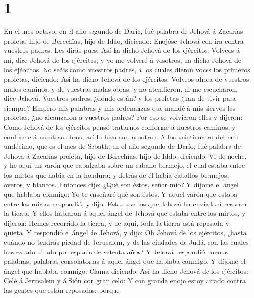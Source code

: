 \hypertarget{section}{%
\section{1}\label{section}}

 En el mes octavo, en el año segundo de Darío, fué palabra
de Jehová á Zacarías profeta, hijo de Berechîas, hijo de Iddo, diciendo:
 Enojóse Jehová con ira contra vuestros padres. 
Les dirás pues: Así ha dicho Jehová de los ejércitos: Volveos á mí, dice
Jehová de los ejércitos, y yo me volveré á vosotros, ha dicho Jehová de
los ejércitos.  No seáis como vuestros padres, á los cuales
dieron voces los primeros profetas, diciendo: Así ha dicho Jehová de los
ejércitos: Volveos ahora de vuestros malos caminos, y de vuestras malas
obras: y no atendieron, ni me escucharon, dice Jehová. 
Vuestros padres, ¿dónde están? y los profetas ¿han de vivir para
siempre?  Empero mis palabras y mis ordenanzas que mandé á
mis siervos los profetas, ¿no alcanzaron á vuestros padres? Por eso se
volvieron ellos y dijeron: Como Jehová de los ejércitos pensó tratarnos
conforme á nuestros caminos, y conforme á nuestras obras, así lo hizo
con nosotros.  A los veinticuatro del mes undécimo, que es
el mes de Sebath, en el año segundo de Darío, fué palabra de Jehová á
Zacarías profeta, hijo de Berechîas, hijo de Iddo, diciendo:
 Vi de noche, y he aquí un varón que cabalgaba sobre un
caballo bermejo, el cual estaba entre los mirtos que había en la
hondura; y detrás de él había caballos bermejos, overos, y blancos.
 Entonces dije: ¿Qué son éstos, señor mío? Y díjome el ángel
que hablaba conmigo: Yo te enseñaré qué son éstos.  Y aquel
varón que estaba entre los mirtos respondió, y dijo: Estos son los que
Jehová ha enviado á recorrer la tierra.  Y ellos hablaron á
aquel ángel de Jehová que estaba entre los mirtos, y dijeron: Hemos
recorrido la tierra, y he aquí, toda la tierra está reposada y quieta.
 Y respondió el ángel de Jehová, y dijo: Oh Jehová de los
ejércitos, ¿hasta cuándo no tendrás piedad de Jerusalem, y de las
ciudades de Judá, con las cuales has estado airado por espacio de
setenta años?  Y Jehová respondió buenas palabras, palabras
consolatorias á aquel ángel que hablaba conmigo.  Y díjome
el ángel que hablaba conmigo: Clama diciendo: Así ha dicho Jehová de los
ejércitos: Celé á Jerusalem y á Sión con gran celo:  Y con
grande enojo estoy airado contra las gentes que están reposadas; porque
